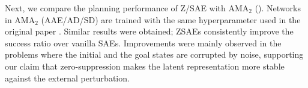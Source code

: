 Next, we compare the planning performance of Z/SAE with AMA$_2$ ().
Networks in AMA$_2$ (AAE/AD/SD) are trained with the same hyperparameter 
used in the original paper \cite{Asai2018}.
Similar results were obtained; ZSAEs consistently improve the success ratio over vanilla SAEs.
Improvements were mainly observed in the problems where
the initial and the goal states are corrupted by noise, supporting our claim that
zero-suppression makes the latent representation more stable against the external perturbation.

% 
% 

